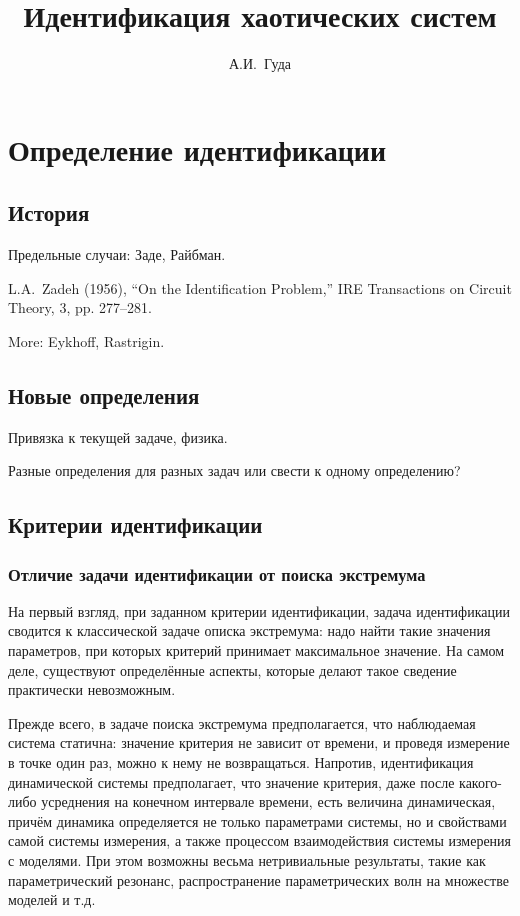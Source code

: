 \documentclass[a4paper,12pt]{article}
\title{Идентификация хаотических систем}
\author{А.И.~Гуда}
\begin{document}
{ \tiny \currfilepath }

\tableofcontents


\section{Определение идентификации}

\subsection{История}

Предельные случаи: Заде, Райбман.

L.A.~Zadeh (1956), ``On the Identification Problem,''
IRE Transactions on Circuit Theory, 3, pp.  277--281.

More: Eykhoff, Rastrigin.

\subsection{Новые определения}

Привязка к текущей задаче, физика.

Разные определения для разных задач или свести к одному определению?

\subsection{Критерии идентификации}

\subsubsection{Отличие задачи идентификации от поиска экстремума}

На первый взгляд, при заданном критерии идентификации, задача идентификации
сводится к классической задаче описка экстремума: надо найти такие значения
параметров, при которых критерий принимает максимальное значение.
На самом деле, существуют определённые аспекты, которые делают такое
сведение практически невозможным.

Прежде всего, в задаче поиска
экстремума предполагается, что наблюдаемая система статична:
значение критерия не зависит от времени, и проведя измерение
в точке один раз, можно к нему не возвращаться.
Напротив, идентификация динамической системы предполагает,
что значение критерия, даже после какого-либо усреднения на конечном
интервале времени, есть величина динамическая, причём динамика определяется
не только параметрами системы, но и свойствами самой системы измерения,
а также процессом взаимодействия системы измерения с моделями. При этом
возможны весьма нетривиальные результаты, такие как параметрический
резонанс, распространение параметрических волн на множестве моделей и т.д.
\end{document}
